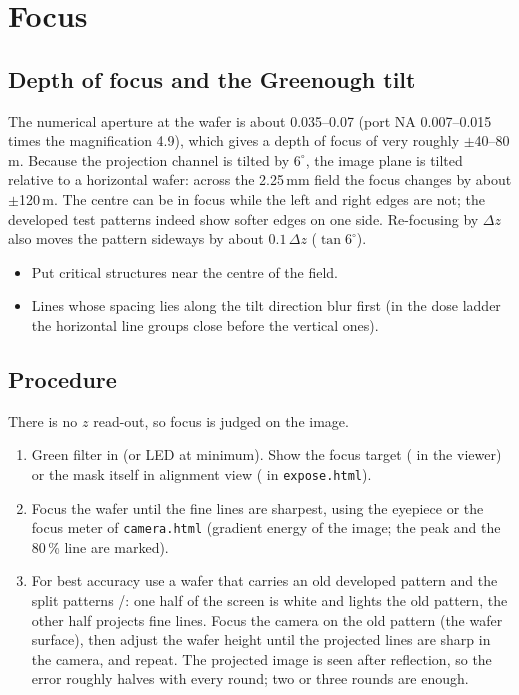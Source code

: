 \documentclass[11pt,a4paper]{article}
\newcommand{\um}{\,\textmu m}
\newcommand{\key}[1]{\fbox{\footnotesize\texttt{#1}}}
\newcommand{\file}[1]{\texttt{#1}}
\begin{document}
\section{Focus}
\label{sec:focus}
\subsection{Depth of focus and the Greenough tilt}
The numerical aperture at the wafer is about 0.035--0.07 (port NA 0.007--0.015 times the magnification 4.9), which
gives a depth of focus of very roughly $\pm$40--80\um. Because the projection channel is tilted by $6^\circ$, the image
plane is tilted relative to a horizontal wafer: across the 2.25\,mm field the focus changes by about $\pm$120\um. The
centre can be in focus while the left and right edges are not; the developed test patterns indeed show softer edges on
one side. Re-focusing by $\Delta z$ also moves the pattern sideways by about $0.1\,\Delta z$ ($\tan 6^\circ$).
\begin{itemize}
  \item Put critical structures near the centre of the field.
  \item Lines whose spacing lies along the tilt direction blur first (in the dose ladder the horizontal line groups
        close before the vertical ones).
\end{itemize}

\subsection{Procedure}
There is no $z$ read-out, so focus is judged on the image.
\begin{enumerate}
  \item Green filter in (or LED at minimum). Show the focus target (\key{G} in the viewer) or the mask itself in
        alignment view (\key{O} in \file{expose.html}).
  \item Focus the wafer until the fine lines are sharpest, using the eyepiece or the focus meter of \file{camera.html}
        (gradient energy of the image; the peak and the 80\,\% line are marked).
  \item For best accuracy use a wafer that carries an old developed pattern and the split patterns \key{K}/\key{J}:
        one half of the screen is white and lights the old pattern, the other half projects fine lines. Focus the
        camera on the old pattern (the wafer surface), then adjust the wafer height until the projected lines are
        sharp in the camera, and repeat. The projected image is seen after reflection, so the error roughly halves
        with every round; two or three rounds are enough.
\end{enumerate}
\end{document}
